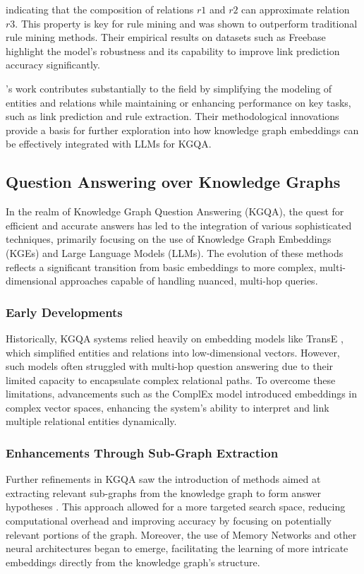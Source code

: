 \documentclass[12pt]{article}
\begin{document}
indicating that the composition of relations $r1$ and $r2$ can approximate relation $r3$. This property is key for rule mining and was shown to outperform traditional rule mining methods. Their empirical results on datasets such as Freebase highlight the model's robustness and its capability to improve link prediction accuracy significantly.

\textcite{yang2015embedding}'s work contributes substantially to the field by simplifying the modeling of entities and relations while maintaining or enhancing performance on key tasks, such as link prediction and rule extraction. Their methodological innovations provide a basis for further exploration into how knowledge graph embeddings can be effectively integrated with LLMs for KGQA.

\subsection{Question Answering over Knowledge Graphs}
In the realm of Knowledge Graph Question Answering (KGQA), the quest for efficient and accurate answers has led to the integration of various sophisticated techniques, primarily focusing on the use of Knowledge Graph Embeddings (KGEs) and Large Language Models (LLMs). The evolution of these methods reflects a significant transition from basic embeddings to more complex, multi-dimensional approaches capable of handling nuanced, multi-hop queries.

\subsubsection{Early Developments}
Historically, KGQA systems relied heavily on embedding models like TransE \textcite{bordes2013translating}, which simplified entities and relations into low-dimensional vectors. However, such models often struggled with multi-hop question answering due to their limited capacity to encapsulate complex relational paths. To overcome these limitations, advancements such as the ComplEx model \textcite{trouillon2016complex} introduced embeddings in complex vector spaces, enhancing the system's ability to interpret and link multiple relational entities dynamically.

\subsubsection{Enhancements Through Sub-Graph Extraction}
Further refinements in KGQA saw the introduction of methods aimed at extracting relevant sub-graphs from the knowledge graph to form answer hypotheses \parencite{yih2015semantic, bao2016constraint}. This approach allowed for a more targeted search space, reducing computational overhead and improving accuracy by focusing on potentially relevant portions of the graph. Moreover, the use of Memory Networks and other neural architectures began to emerge, facilitating the learning of more intricate embeddings directly from the knowledge graph's structure.
\end{document}
